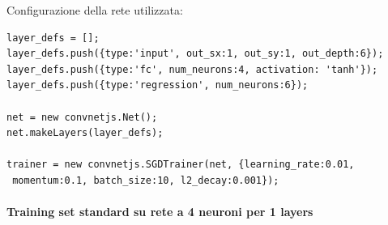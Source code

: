 Configurazione della rete utilizzata:\\
\begin{verbatim}layer_defs = [];
layer_defs.push({type:'input', out_sx:1, out_sy:1, out_depth:6});
layer_defs.push({type:'fc', num_neurons:4, activation: 'tanh'});
layer_defs.push({type:'regression', num_neurons:6});

net = new convnetjs.Net();
net.makeLayers(layer_defs);

trainer = new convnetjs.SGDTrainer(net, {learning_rate:0.01,
 momentum:0.1, batch_size:10, l2_decay:0.001});
\end{verbatim}

\paragraph{Training set standard su rete a 4 neuroni per 1 layers}\mbox{}
\label{Training set standard su rete a 4 neuroni per 1 layers}
\\
\noindent
